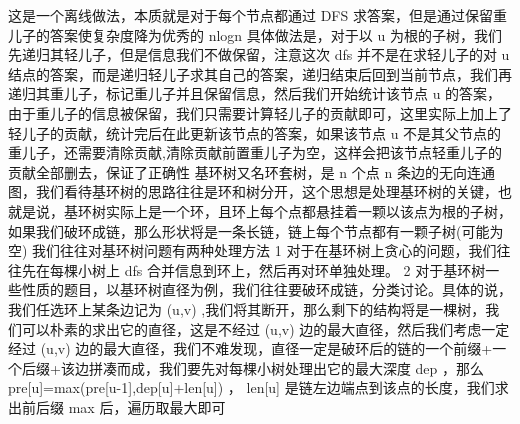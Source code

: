 {}
\markdownRendererSectionEnd \markdownRendererSectionBegin
{}\markdownRendererInterblockSeparator
{}这是一个离线做法，本质就是对于每个节点都通过\markdownRendererDollarSign{} DFS \markdownRendererDollarSign{}求答案，但是通过保留重儿子的答案使复杂度降为优秀的\markdownRendererDollarSign{} nlogn \markdownRendererDollarSign{}\markdownRendererParagraphSeparator
{}具体做法是，对于以\markdownRendererDollarSign{} u \markdownRendererDollarSign{}为根的子树，我们先递归其轻儿子，但是信息我们不做保留，注意这次\markdownRendererDollarSign{} dfs \markdownRendererDollarSign{}并不是在求轻儿子的对\markdownRendererDollarSign{} u \markdownRendererDollarSign{}结点的答案，而是递归轻儿子求其自己的答案，递归结束后回到当前节点，我们再递归其重儿子，标记重儿子并且保留信息，然后我们开始统计该节点\markdownRendererDollarSign{} u \markdownRendererDollarSign{}的答案，由于重儿子的信息被保留，我们只需要计算轻儿子的贡献即可，这里实际上加上了轻儿子的贡献，统计完后在此更新该节点的答案，如果该节点\markdownRendererDollarSign{} u \markdownRendererDollarSign{}不是其父节点的重儿子，还需要清除贡献,清除贡献前置重儿子为空，这样会把该节点轻重儿子的贡献全部删去，保证了正确性\markdownRendererInterblockSeparator
{}\markdownRendererInterblockSeparator
{}
\markdownRendererSectionEnd \markdownRendererSectionBegin
{}\markdownRendererInterblockSeparator
{}基环树又名环套树，是\markdownRendererDollarSign{} n \markdownRendererDollarSign{}个点\markdownRendererDollarSign{} n \markdownRendererDollarSign{}条边的无向连通图，我们看待基环树的思路往往是环和树分开，这个思想是处理基环树的关键，也就是说，基环树实际上是一个环，且环上每个点都悬挂着一颗以该点为根的子树，如果我们破环成链，那么形状将是一条长链，链上每个节点都有一颗子树(可能为空)\markdownRendererParagraphSeparator
{}我们往往对基环树问题有两种处理方法\markdownRendererParagraphSeparator
{}\markdownRendererDollarSign{} 1 \markdownRendererDollarSign{} 对于在基环树上贪心的问题，我们往往先在每棵小树上\markdownRendererDollarSign{} dfs \markdownRendererDollarSign{}合并信息到环上，然后再对环单独处理。\markdownRendererParagraphSeparator
{}\markdownRendererDollarSign{} 2 \markdownRendererDollarSign{}对于基环树一些性质的题目，以基环树直径为例，我们往往要破环成链，分类讨论。具体的说，我们任选环上某条边记为\markdownRendererDollarSign{} (u,v) \markdownRendererDollarSign{},我们将其断开，那么剩下的结构将是一棵树，我们可以朴素的求出它的直径，这是不经过\markdownRendererDollarSign{} (u,v) \markdownRendererDollarSign{}边的最大直径，然后我们考虑一定经过\markdownRendererDollarSign{} (u,v) \markdownRendererDollarSign{}边的最大直径，我们不难发现，直径一定是破环后的链的一个前缀+一个后缀+该边拼凑而成，我们要先对每棵小树处理出它的最大深度\markdownRendererDollarSign{} dep \markdownRendererDollarSign{}，那么\markdownRendererDollarSign{} pre[u]=max(pre[u-1],dep[u]+len[u]) \markdownRendererDollarSign{}，\markdownRendererDollarSign{} len[u] \markdownRendererDollarSign{}是链左边端点到该点的长度，我们求出前后缀\markdownRendererDollarSign{} max \markdownRendererDollarSign{}后，遍历取最大即可\markdownRendererInterblockSeparator
